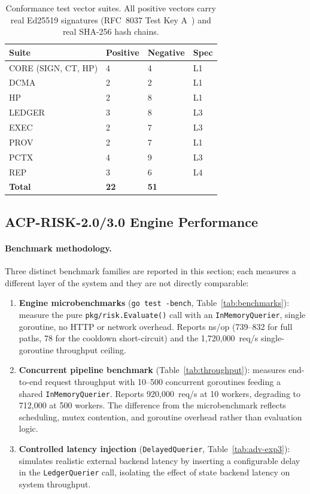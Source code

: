 \documentclass[11pt]{article}
\theoremstyle{definition}
\begin{document}
\begin{table}[h!]
\centering
\small
\begin{tabular}{@{}llll@{}}
\toprule
\textbf{Suite} & \textbf{Positive} & \textbf{Negative} & \textbf{Spec} \\
\midrule
CORE (SIGN, CT, HP) & 4 & 4 & L1 \\
DCMA & 2 & 2 & L1 \\
HP & 2 & 8 & L1 \\
LEDGER & 3 & 8 & L3 \\
EXEC & 2 & 7 & L3 \\
PROV & 2 & 7 & L1 \\
PCTX & 4 & 9 & L3 \\
REP & 3 & 6 & L4 \\
\midrule
\textbf{Total} & \textbf{22} & \textbf{51} & \\
\bottomrule
\end{tabular}
\caption{Conformance test vector suites. All positive vectors carry real Ed25519 signatures (RFC~8037 Test Key A~\cite{rfc8037}) and real SHA-256 hash chains.}
\end{table}

\subsection{ACP-RISK-2.0/3.0 Engine Performance}

\paragraph{Benchmark methodology.}
Three distinct benchmark families are reported in this section; each measures a different
layer of the system and they are not directly comparable:

\begin{enumerate}[noitemsep]
  \item \textbf{Engine microbenchmarks} (\texttt{go test -bench}, Table~\ref{tab:benchmarks}):
    measure the pure \texttt{pkg/risk.Evaluate()} call with an \texttt{InMemoryQuerier},
    single goroutine, no HTTP or network overhead.
    Reports ns/op (739--832 for full paths, 78 for the cooldown short-circuit)
    and the 1{,}720{,}000~req/s single-goroutine throughput ceiling.

  \item \textbf{Concurrent pipeline benchmark} (Table~\ref{tab:throughput}):
    measures end-to-end request throughput with 10--500 concurrent goroutines
    feeding a shared \texttt{InMemoryQuerier}.
    Reports 920{,}000~req/s at 10 workers, degrading to 712{,}000 at 500 workers.
    The difference from the microbenchmark reflects scheduling, mutex contention,
    and goroutine overhead rather than evaluation logic.

  \item \textbf{Controlled latency injection} (\texttt{DelayedQuerier}, Table~\ref{tab:adv-exp3}):
    simulates realistic external backend latency by inserting a configurable
    delay in the \texttt{LedgerQuerier} call, isolating the effect of state
    backend latency on system throughput.
\end{enumerate}
\end{document}
